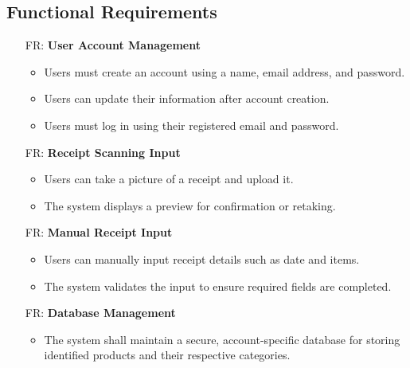 \documentclass[12pt]{article}
\newcounter{frnum} %
\begin{document}
\subsection{Functional Requirements}
\noindent
\begin{itemize}
  \item [FR\refstepcounter{frnum}\thefrnum :] \textbf{User Account Management}
    \begin{itemize}
      \item Users must create an account using a name, email address, and password.
      \item Users can update their information after account creation.
      \item Users must log in using their registered email and password.
    \end{itemize}
  
  \item [FR\refstepcounter{frnum}\thefrnum :] \textbf{Receipt Scanning Input}
    \begin{itemize}
      \item Users can take a picture of a receipt and upload it.
      \item The system displays a preview for confirmation or retaking.
    \end{itemize}

  \item [FR\refstepcounter{frnum}\thefrnum :] \textbf{Manual Receipt Input}
    \begin{itemize}
      \item Users can manually input receipt details such as date and items.
      \item The system validates the input to ensure required fields are completed.
    \end{itemize}

  \item [FR\refstepcounter{frnum}\thefrnum :] \textbf{Database Management}
    \begin{itemize}
      \item The system shall maintain a secure, account-specific database for storing identified products and their respective categories.
    \end{itemize}


\end{itemize}
\end{document}
